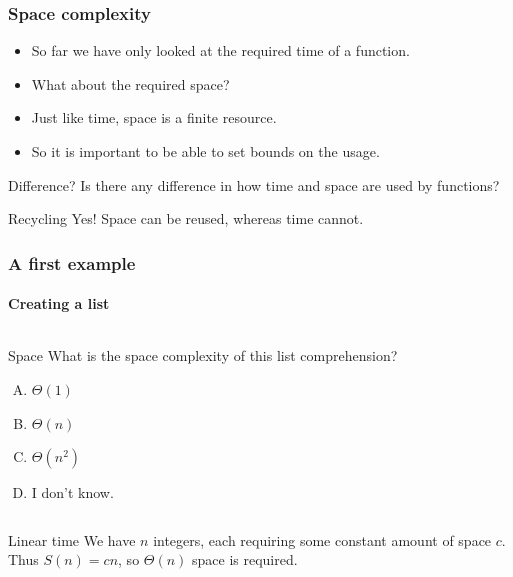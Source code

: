 \begin{frame}
	\frametitle{Space complexity}
	\begin{itemize}
		\item So far we have only looked at the required \alert{time} of a function.
		\item What about the required \alert{space}?
			\pause
		\item Just like time, space is a \alert{finite} resource.	
		\item So it is important to be able to set bounds on the usage.
	\end{itemize}
	\pause
	\begin{block}{Difference?}
		Is there any difference in how time and space are used by functions?
	\end{block}
	\pause
	\begin{block}{Recycling}
		Yes! Space can be reused, whereas time cannot.
	\end{block}
\end{frame}

\begin{frame}
	\frametitle{A first example}
	\framesubtitle{Creating a list}
	
	\begin{columns}
			
		\pause
		\begin{block}{Space}
			What is the \alert{space} complexity of this list comprehension?
			\begin{enumerate}[A.]
				\item $\Theta(1)$
				\item $\Theta(n)$ 
				\item $\Theta(n^2)$
				\item I don't know.
			\end{enumerate}
		\end{block}
	\end{columns}
	\pause
	\begin{block}{Linear time}
		We have $n$ integers, each requiring some constant amount of space $c$. Thus $S(n) = cn$, so $\Theta(n)$ space is
		required.
	\end{block}
\end{frame}

